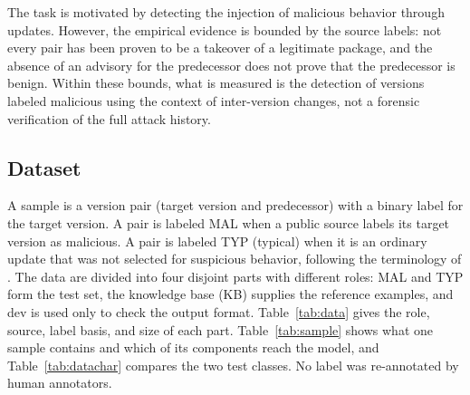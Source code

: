 \documentclass[a4paper,fleqn]{cas-dc}
\begin{document}
The task is motivated by detecting the injection of malicious behavior through
updates. However, the empirical evidence is bounded by the source labels: not
every pair has been proven to be a takeover of a legitimate package, and the
absence of an advisory for the predecessor does not prove that the predecessor
is benign. Within these bounds, what is measured is the detection of versions
labeled malicious using the context of inter-version changes, not a forensic
verification of the full attack history.

\subsection{Dataset}\label{sec:data}
A sample is a version pair (target version and predecessor) with a binary
label for the target version. A pair is labeled MAL when a public source
labels its target version as malicious. A pair is labeled TYP (typical) when
it is an ordinary update that was not selected for suspicious behavior,
following the terminology of \citet{wyss2025evaluating}. The data are divided
into four disjoint parts with different roles: MAL and TYP form the test set,
the knowledge base (KB) supplies the reference examples, and dev is used only
to check the output format. Table~\ref{tab:data} gives the role, source, label
basis, and size of each part. Table~\ref{tab:sample} shows what one sample
contains and which of its components reach the model, and
Table~\ref{tab:datachar} compares the two test classes. No label was
re-annotated by human annotators.
\end{document}
